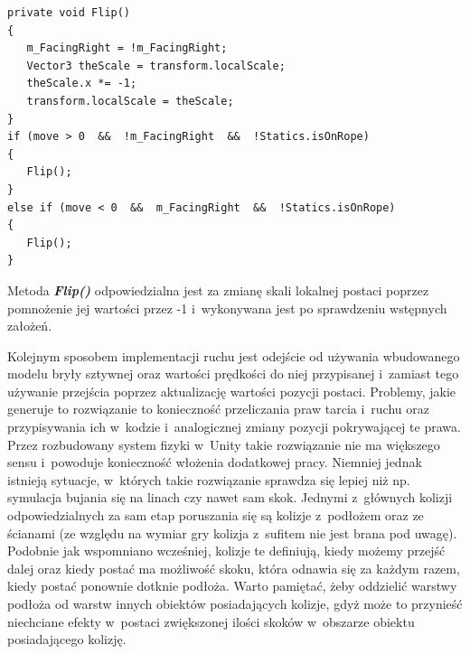 \documentclass[oneside,polski,logo]{amuthesis}
\begin{document}
\begin{lstlisting}[breaklines=true,
language={[Sharp]C},
rulecolor=\color{blue!80!black},
caption={Fragment klasy \texttt{CharacterController.cs}}
]
private void Flip()
{
   m_FacingRight = !m_FacingRight;
   Vector3 theScale = transform.localScale;
   theScale.x *= -1;
   transform.localScale = theScale;
}
if (move > 0  &&  !m_FacingRight  &&  !Statics.isOnRope)
{
   Flip();
}
else if (move < 0  &&  m_FacingRight  &&  !Statics.isOnRope)
{ 
   Flip();
}
\end{lstlisting}

Metoda \textbf{\textit{Flip()}} odpowiedzialna jest za zmianę skali lokalnej postaci poprzez pomnożenie jej wartości przez -1 i~wykonywana jest po sprawdzeniu wstępnych założeń.

Kolejnym sposobem implementacji ruchu jest odejście od używania wbudowanego modelu bryły sztywnej oraz wartości prędkości do niej przypisanej i~zamiast tego używanie przejścia poprzez aktualizację wartości pozycji postaci. Problemy, jakie generuje to rozwiązanie to konieczność przeliczania praw tarcia i~ruchu oraz przypisywania ich w~kodzie i~analogicznej zmiany pozycji pokrywającej te prawa. Przez rozbudowany system fizyki w~Unity takie rozwiązanie nie ma większego sensu i~powoduje konieczność włożenia dodatkowej pracy. Niemniej jednak istnieją sytuacje, w~których takie rozwiązanie sprawdza się lepiej niż np. symulacja bujania się na linach czy nawet sam skok.
Jednymi z~głównych kolizji odpowiedzialnych za sam etap poruszania się są kolizje z~podłożem oraz ze ścianami (ze względu na wymiar gry kolizja z~sufitem nie jest brana pod uwagę). Podobnie jak wspomniano wcześniej, kolizje te definiują, kiedy możemy przejść dalej oraz kiedy postać ma możliwość skoku, która odnawia się za każdym razem, kiedy postać ponownie dotknie podłoża. Warto pamiętać, żeby oddzielić warstwy podłoża od warstw innych obiektów posiadających kolizje, gdyż może to przynieść niechciane efekty w~postaci zwiększonej ilości skoków w~obszarze obiektu posiadającego kolizję.
\end{document}
